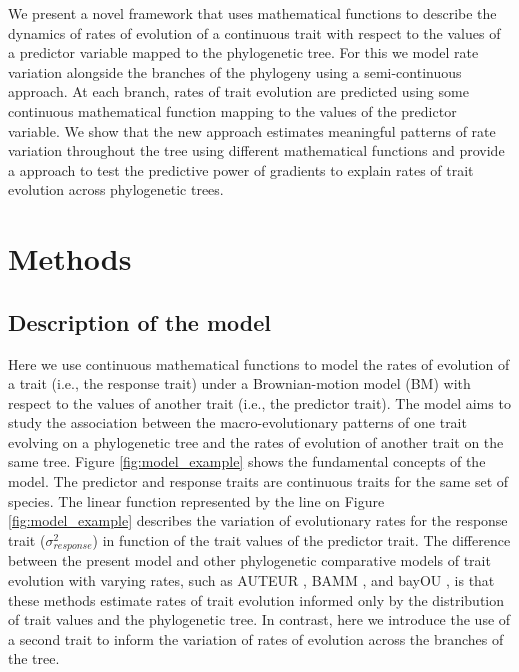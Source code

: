 We present a novel framework that uses mathematical functions to describe the dynamics of rates of evolution of a continuous trait with respect to the values of a predictor variable mapped to the phylogenetic tree. For this we model rate variation alongside the branches of the phylogeny using a semi-continuous approach. At each branch, rates of trait evolution are predicted using some continuous mathematical function mapping to the values of the predictor variable. We show that the new approach estimates meaningful patterns of rate variation throughout the tree using different mathematical functions and provide a approach to test the predictive power of gradients to explain rates of trait evolution across phylogenetic trees.

\section{Methods}

\subsection{Description of the model}

Here we use continuous mathematical functions to model the rates of evolution of a trait (i.e., the response trait) under a Brownian-motion model (BM) with respect to the values of another trait (i.e., the predictor trait). The model aims to study the association between the macro-evolutionary patterns of one trait evolving on a phylogenetic tree and the rates of evolution of another trait on the same tree. Figure \ref{fig:model_example} shows the fundamental concepts of the model. The predictor and response traits are continuous traits for the same set of species. The linear function represented by the line on Figure \ref{fig:model_example} describes the variation of evolutionary rates for the response trait ($\sigma^{2}_{response}$) in function of the trait values of the predictor trait. The difference between the present model and other phylogenetic comparative models of trait evolution with varying rates, such as AUTEUR \citep{Eastman_2011}, BAMM \citep{rabosky_analysis_2014}, and bayOU \citep{Uyeda_BayOU}, is that these methods estimate rates of trait evolution informed only by the distribution of trait values and the phylogenetic tree. In contrast, here we introduce the use of a second trait to inform the variation of rates of evolution across the branches of the tree.

